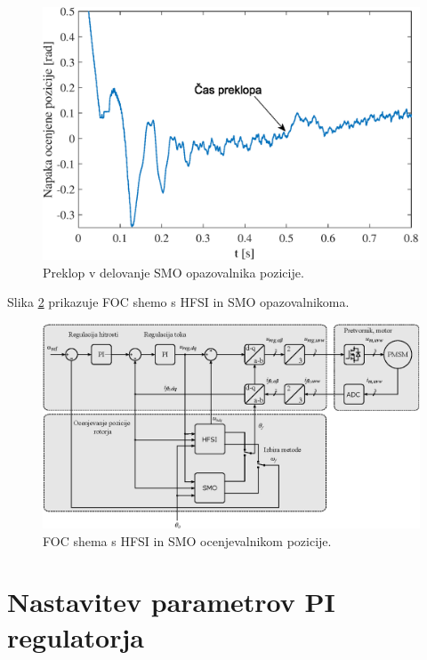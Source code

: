 \documentclass[a4paper,twoside,openright,12pt,slovene]{book}
\begin{document}
\begin{figure}[!htbp]
    \centering
    \includegraphics[width=0.8\columnwidth]{Slike/brezudarniPreklop_Err.eps}
    \caption{\label{brezudarniPreklop_Err} Preklop v delovanje SMO opazovalnika pozicije. }
\end{figure}

\newpage
Slika \ref{FOC} prikazuje FOC shemo s HFSI in SMO opazovalnikoma. 

\begin{figure}[!htbp]
    \centering
    \includegraphics[width=0.95\columnwidth]{Slike/Inkscape/FOC.eps}
    \caption{\label{FOC} FOC shema s HFSI in SMO ocenjevalnikom pozicije. }
\end{figure}

\newpage
\section{Nastavitev parametrov PI regulatorja}
\end{document}
